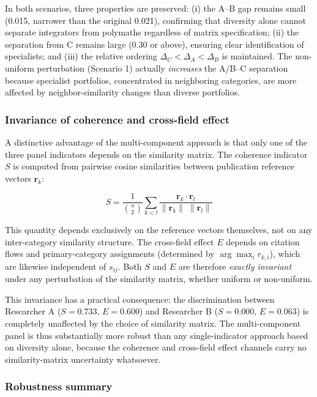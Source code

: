 \documentclass[
]{article}
\begin{document}
In both scenarios, three properties are preserved: (i) the A--B gap
remains small (0.015, narrower than the original 0.021), confirming that
diversity alone cannot separate integrators from polymaths regardless of
matrix specification; (ii) the separation from C remains large (0.30 or
above), ensuring clear identification of specialists; and (iii) the
relative ordering \(\Delta_C < \Delta_A < \Delta_B\) is maintained. The
non-uniform perturbation (Scenario 1) actually \emph{increases} the
A/B--C separation because specialist portfolios, concentrated in
neighboring categories, are more affected by neighbor-similarity changes
than diverse portfolios.

\hypertarget{invariance-of-coherence-and-cross-field-effect}{%
\subsubsection{Invariance of coherence and cross-field
effect}\label{invariance-of-coherence-and-cross-field-effect}}

A distinctive advantage of the multi-component approach is that only one
of the three panel indicators depends on the similarity matrix. The
coherence indicator \(S\) is computed from pairwise cosine similarities
between publication reference vectors \(\mathbf{r}_k\):

\[S = \frac{1}{\binom{n}{2}} \sum_{k < l}
  \frac{\mathbf{r}_k \cdot \mathbf{r}_l}
       {\|\mathbf{r}_k\|\;\|\mathbf{r}_l\|}\]

This quantity depends exclusively on the reference vectors themselves,
not on any inter-category similarity structure. The cross-field effect
\(E\) depends on citation flows and primary-category assignments
(determined by \(\arg\max_i r_{k,i}\)), which are likewise independent
of \(s_{ij}\). Both \(S\) and \(E\) are therefore \emph{exactly
invariant} under any perturbation of the similarity matrix, whether
uniform or non-uniform.

This invariance has a practical consequence: the discrimination between
Researcher A (\(S = 0.733\), \(E = 0.600\)) and Researcher B
(\(S = 0.000\), \(E = 0.063\)) is completely unaffected by the choice of
similarity matrix. The multi-component panel is thus substantially more
robust than any single-indicator approach based on diversity alone,
because the coherence and cross-field effect channels carry no
similarity-matrix uncertainty whatsoever.

\hypertarget{robustness-summary}{%
\subsubsection{Robustness summary}\label{robustness-summary}}
\end{document}
